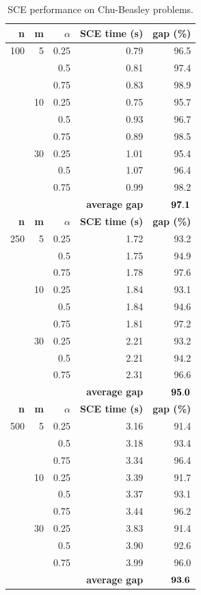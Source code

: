 \begin{table}
{
\renewcommand{\arraystretch}{1.5}%
\fontsize{8.5pt}{1em}\selectfont 
\begin{center}
\begin{tabular}{|r|r|r|rr|} \hline
\textbf{n}   & \textbf{m}  & \textbf{$\alpha$} & \textbf{SCE time (s)} & \textbf{gap (\%)} \\ \hline
100 & 5 & 0.25 & 0.79 & 96.5 \\
    &   & 0.5 & 0.81 & 97.4 \\
    &   & 0.75 & 0.83 & 98.9 \\ \cline{2-5}
    & 10 & 0.25 & 0.75 & 95.7 \\
    &    & 0.5 & 0.93 & 96.7 \\
    &    & 0.75 & 0.89 & 98.5 \\ \cline{2-5}
    & 30 & 0.25 & 1.01 & 95.4 \\
    &    & 0.5 & 1.07 & 96.4 \\
    &    & 0.75 & 0.99 & 98.2 \\ \cline{2-5}
    & \multicolumn{3}{r}{\textbf{average gap}}  & $\bf 97.1$  \\ \hline \hline
\textbf{n}   & \textbf{m}  & \textbf{$\alpha$} & \textbf{SCE time (s)} & \textbf{gap (\%)} \\ \hline
250 & 5 & 0.25 & 1.72 & 93.2 \\
    &   & 0.5 & 1.75 & 94.9 \\
    &   & 0.75 & 1.78 & 97.6 \\ \cline{2-5}
    & 10 & 0.25 & 1.84 & 93.1 \\
    &    & 0.5 & 1.84 & 94.6 \\
    &    & 0.75 & 1.81 & 97.2 \\ \cline{2-5}
    & 30 & 0.25 & 2.21 & 93.2 \\
    &    & 0.5 & 2.21 & 94.2 \\
    &    & 0.75 & 2.31 & 96.6 \\ \cline{2-5}
    & \multicolumn{3}{r}{\textbf{average gap}}  & $\bf 95.0$  \\ \hline \hline
\textbf{n}   & \textbf{m}  & \textbf{$\alpha$} & \textbf{SCE time (s)} & \textbf{gap (\%)} \\ \hline
500 & 5 & 0.25 & 3.16 & 91.4 \\
    &   & 0.5 & 3.18 & 93.4 \\
    &   & 0.75 & 3.34 & 96.4 \\ \cline{2-5}
    & 10 & 0.25 & 3.39 & 91.7 \\
    &    & 0.5 & 3.37 & 93.1 \\
    &    & 0.75 & 3.44 & 96.2 \\ \cline{2-5}
    & 30 & 0.25 & 3.83 & 91.4 \\
    &    & 0.5 & 3.90 & 92.6 \\
    &    & 0.75 & 3.99 & 96.0 \\ \cline{2-5}
    & \multicolumn{3}{r}{\textbf{average gap}}  & $\bf 93.6$  \\ \hline
\end{tabular}
\end{center}
}
 \caption{SCE performance on Chu-Beasley problems.}
 \label{tab:chu}
\end{table}

